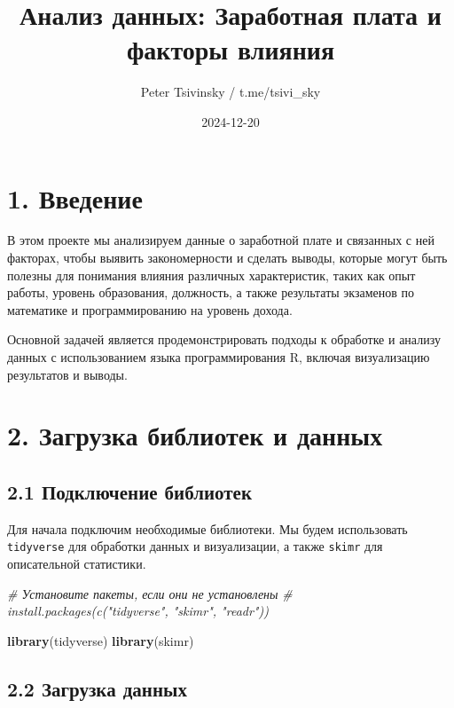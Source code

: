 \documentclass[
]{article}
\title{Анализ данных: Заработная плата и факторы влияния}
\author{Peter Tsivinsky / t.me/tsivi\_sky}
\date{2024-12-20}
\newenvironment{Shaded}{\begin{snugshade}}{\end{snugshade}}
\newcommand{\CommentTok}[1]{\textcolor[rgb]{0.56,0.35,0.01}{\textit{#1}}}
\newcommand{\FunctionTok}[1]{\textcolor[rgb]{0.13,0.29,0.53}{\textbf{#1}}}
\newcommand{\NormalTok}[1]{#1}
\begin{document}
\maketitle

\section{1. Введение}\label{ux432ux432ux435ux434ux435ux43dux438ux435}

В этом проекте мы анализируем данные о заработной плате и связанных с
ней факторах, чтобы выявить закономерности и сделать выводы, которые
могут быть полезны для понимания влияния различных характеристик, таких
как опыт работы, уровень образования, должность, а также результаты
экзаменов по математике и программированию на уровень дохода.

Основной задачей является продемонстрировать подходы к обработке и
анализу данных с использованием языка программирования R, включая
визуализацию результатов и выводы.

\section{2. Загрузка библиотек и
данных}\label{ux437ux430ux433ux440ux443ux437ux43aux430-ux431ux438ux431ux43bux438ux43eux442ux435ux43a-ux438-ux434ux430ux43dux43dux44bux445}

\subsection{2.1 Подключение
библиотек}\label{ux43fux43eux434ux43aux43bux44eux447ux435ux43dux438ux435-ux431ux438ux431ux43bux438ux43eux442ux435ux43a}

Для начала подключим необходимые библиотеки. Мы будем использовать
\texttt{tidyverse} для обработки данных и визуализации, а также
\texttt{skimr} для описательной статистики.

\begin{Shaded}
\begin{Highlighting}[]
\CommentTok{\# Установите пакеты, если они не установлены}
\CommentTok{\# install.packages(c("tidyverse", "skimr", "readr"))}

\FunctionTok{library}\NormalTok{(tidyverse)}
\FunctionTok{library}\NormalTok{(skimr)}
\end{Highlighting}
\end{Shaded}

\subsection{2.2 Загрузка
данных}\label{ux437ux430ux433ux440ux443ux437ux43aux430-ux434ux430ux43dux43dux44bux445}
\end{document}
